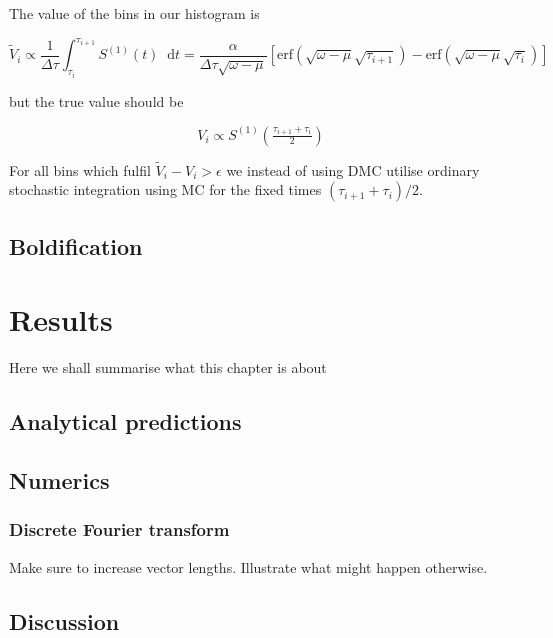 \documentclass[12pt]{report}
\newcommand*\diff{\mathop{}\!\mathrm{d}}
\newcommand{\todo}[1]{{\leavevmode\color{todo}#1}}
\begin{document}
The value of the bins in our histogram is

\begin{equation}
	\tilde V_i \propto \frac{1}{\Delta \tau} \int_{\tau_i}^{\tau_{i + 1}} S^{(1)} (t) \diff t
	= \frac{\alpha}{\Delta \tau \sqrt{\omega - \mu}} \left[ \text{erf}\left(\sqrt{\omega - \mu} \sqrt{\tau_{i+1}}\right) - \text{erf}\left(\sqrt{\omega - \mu} \sqrt{\tau_i}\right) \right]
\end{equation}

 but the true value should be
 
\begin{equation}
	V_i \propto S^{(1)} \left( \tfrac{\tau_{i+1} + \tau_i}{2} \right)	
\end{equation}

For all bins which fulfil $ \tilde V_i  - V_i > \epsilon $ we instead of using DMC utilise ordinary stochastic integration using MC for the fixed times $ (\tau_{i+1} + \tau_i)/2 $.

\section{Boldification}




\chapter{Results}
\todo{Here we shall summarise what this chapter is about}

\section{Analytical predictions}

\section{Numerics}

\subsection{Discrete Fourier transform}

\todo{Make sure to increase vector lengths. Illustrate what might happen otherwise.}

\section{Discussion}
\end{document}
